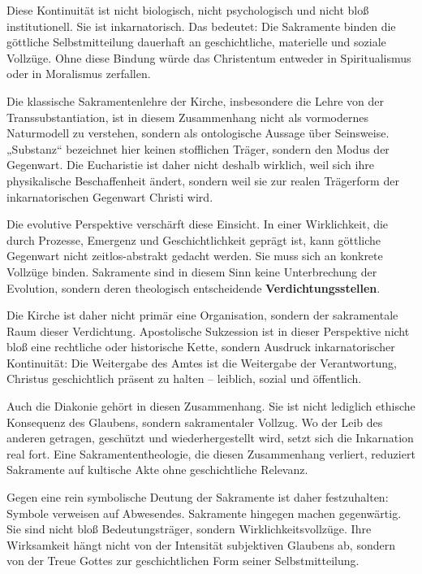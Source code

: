 \documentclass[
]{article}
\begin{document}
Diese Kontinuität ist nicht biologisch, nicht psychologisch und nicht bloß institutionell. Sie ist inkarnatorisch. Das bedeutet: Die Sakramente binden die göttliche Selbstmitteilung dauerhaft an geschichtliche, materielle und soziale Vollzüge. Ohne diese Bindung würde das Christentum entweder in Spiritualismus oder in Moralismus zerfallen.

Die klassische Sakramentenlehre der Kirche, insbesondere die Lehre von der Transsubstantiation, ist in diesem Zusammenhang nicht als vormodernes Naturmodell zu verstehen, sondern als ontologische Aussage über Seinsweise. „Substanz`` bezeichnet hier keinen stofflichen Träger, sondern den Modus der Gegenwart. Die Eucharistie ist daher nicht deshalb wirklich, weil sich ihre physikalische Beschaffenheit ändert, sondern weil sie zur realen Trägerform der inkarnatorischen Gegenwart Christi wird.

Die evolutive Perspektive verschärft diese Einsicht. In einer Wirklichkeit, die durch Prozesse, Emergenz und Geschichtlichkeit geprägt ist, kann göttliche Gegenwart nicht zeitlos-abstrakt gedacht werden. Sie muss sich an konkrete Vollzüge binden. Sakramente sind in diesem Sinn keine Unterbrechung der Evolution, sondern deren theologisch entscheidende \textbf{Verdichtungsstellen}.

Die Kirche ist daher nicht primär eine Organisation, sondern der sakramentale Raum dieser Verdichtung. Apostolische Sukzession ist in dieser Perspektive nicht bloß eine rechtliche oder historische Kette, sondern Ausdruck inkarnatorischer Kontinuität: Die Weitergabe des Amtes ist die Weitergabe der Verantwortung, Christus geschichtlich präsent zu halten -- leiblich, sozial und öffentlich.

Auch die Diakonie gehört in diesen Zusammenhang. Sie ist nicht lediglich ethische Konsequenz des Glaubens, sondern sakramentaler Vollzug. Wo der Leib des anderen getragen, geschützt und wiederhergestellt wird, setzt sich die Inkarnation real fort. Eine Sakramententheologie, die diesen Zusammenhang verliert, reduziert Sakramente auf kultische Akte ohne geschichtliche Relevanz.

Gegen eine rein symbolische Deutung der Sakramente ist daher festzuhalten: Symbole verweisen auf Abwesendes. Sakramente hingegen machen gegenwärtig. Sie sind nicht bloß Bedeutungsträger, sondern Wirklichkeitsvollzüge. Ihre Wirksamkeit hängt nicht von der Intensität subjektiven Glaubens ab, sondern von der Treue Gottes zur geschichtlichen Form seiner Selbstmitteilung.
\end{document}

